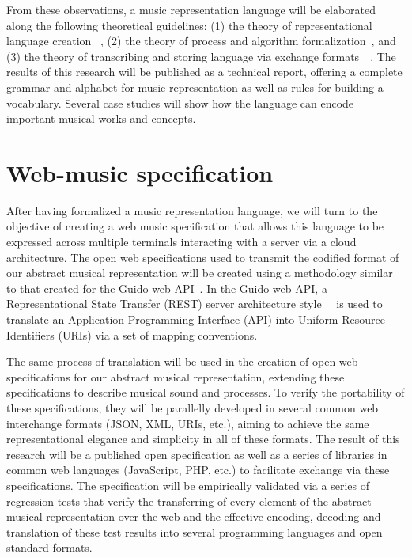 \documentclass{article}
\begin{document}
From these observations, a music representation language will be elaborated
along the following theoretical guidelines: (1) the theory of
representational language creation \cite{wagner2002design}~\cite{shieber1984design},
(2) the theory of process and algorithm
formalization~\cite{salwicki1970formalized}, and
(3) the theory of transcribing and storing language via exchange
formats~\cite{qiu1999programming}~\cite{gruber1993translation}. The
results of this research will be published as a technical report, offering a
complete grammar and alphabet for music representation as well as rules for
building a vocabulary. Several case studies will show how the language can
encode important musical works and concepts.

\section{Web-music specification}\label{sec:web-music-specification}
After having formalized a music representation language, we will turn to the
objective of creating a web music specification that allows this language to be
expressed across multiple terminals interacting with a server via a cloud
architecture. The open web specifications used to transmit the codified format
of our abstract musical representation will be created using a methodology
similar to that created for the Guido web API~\cite{solomon:2014}.
In the Guido web API, a Representational State Transfer (REST) server architecture
style~\cite{Fielding00}~\cite{richardson2008restful} is used to translate an Application
Programming Interface (API) into Uniform Resource Identifiers (URIs) via a
set of mapping conventions.

The same process of translation will be used in the
creation of open web specifications for our abstract musical representation,
extending these specifications to describe musical sound and processes. To verify
the portability of these specifications, they will be parallelly
developed in several common web interchange formats (JSON, XML, URIs, etc.),
aiming to achieve the same representational elegance and simplicity in all
of these formats. The result of this research will be a published open
specification as well as a series of libraries in common web languages
(JavaScript, PHP, etc.) to facilitate exchange via these specifications. The
specification will be empirically validated via a series of regression tests that
verify the transferring of every element of the abstract musical
representation over the web and the effective encoding, decoding and
translation of these test results into several programming languages and
open standard formats.
\end{document}
